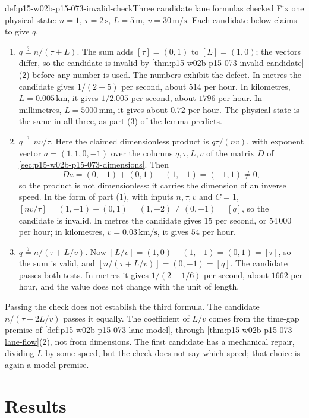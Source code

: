 \begin{hbexample}{def:p15-w02b-p15-073-invalid-check}{Three candidate lane formulas checked}
Fix one physical state: \(n=1\), \(\tau=2\,\mathrm s\), \(L=5\,\mathrm m\),
\(v=30\,\mathrm{m/s}\). Each candidate below claims to give \(q\).
\begin{enumerate}
\item \(q\overset{?}{=}n/(\tau+L)\). The sum adds \([\tau]=(0,1)\) to
\([L]=(1,0)\); the vectors differ, so the candidate is invalid by
\cref{thm:p15-w02b-p15-073-invalid-candidate}(2) before any number is used.
The numbers exhibit the defect. In metres the candidate gives
\(1/(2+5)\) per second, about \(514\) per hour. In kilometres,
\(L=0.005\,\mathrm{km}\), it gives \(1/2.005\) per second, about \(1796\)
per hour. In millimetres, \(L=5000\,\mathrm{mm}\), it gives about \(0.72\)
per hour. The physical state is the same in all three, as part (3) of the
lemma predicts.
\item \(q\overset{?}{=}nv/\tau\). Here the claimed dimensionless product is
\(q\tau/(nv)\), with exponent vector \(a=(1,1,0,-1)\) over the columns
\(q,\tau,L,v\) of the matrix \(D\) of
\cref{sec:p15-w02b-p15-073-dimensions}. Then
\[
 Da=(0,-1)+(0,1)-(1,-1)=(-1,1)\neq0,
\]
so the product is not dimensionless: it carries the dimension of an inverse
speed. In the form of part (1), with inputs \(n,\tau,v\) and \(C=1\),
\([nv/\tau]=(1,-1)-(0,1)=(1,-2)\neq(0,-1)=[q]\), so the candidate is
invalid. In metres the candidate
gives \(15\) per second, or \(54\,000\) per hour; in kilometres,
\(v=0.03\,\mathrm{km/s}\), it gives \(54\) per hour.
\item \(q\overset{?}{=}n/(\tau+L/v)\). Now
\([L/v]=(1,0)-(1,-1)=(0,1)=[\tau]\), so the sum is valid, and
\([n/(\tau+L/v)]=(0,-1)=[q]\). The candidate passes both tests. In metres it
gives \(1/(2+1/6)\) per second, about \(1662\) per hour, and the value does
not change with the unit of length.
\end{enumerate}
Passing the check does not establish the third formula. The candidate
\(n/(\tau+2L/v)\) passes it equally. The coefficient of \(L/v\) comes from the
time-gap premise of \cref{def:p15-w02b-p15-073-lane-model}, through
\cref{thm:p15-w02b-p15-073-lane-flow}(2), not from dimensions. The first
candidate has a mechanical repair, dividing \(L\) by some speed, but the check
does not say which speed; that choice is again a model premise.
\end{hbexample}

\section{Results}
\label{sec:p15-w02b-p15-073-results}


